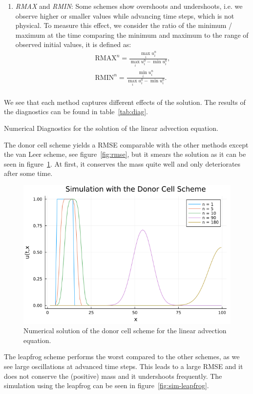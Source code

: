 \begin{enumerate}
    \item \emph{RMAX} and \emph{RMIN}: Some schemes show overshoots and undershoots,
    i.e. we observe higher
    or smaller values while advancing time steps, which is not physical. To 
    measure this effect, we consider
    the ratio of the minimum / maximum at the time comparing the minimum and maximum
    to the range of observed 
    initial values, it is defined as:
    \begin{align*}
        \mathrm{RMAX}^n = \frac{\max_i u_i^n}{\max_i u_i^0 - \min u_i^0}, \\[1em]
        \mathrm{RMIN}^n = \frac{\min_i u_i^n}{\max_i u_i^0 - \min u_i^0}. \\
    \end{align*}    
\end{enumerate}
We see that each method captures different effects of the solution. The results of the diagnostics can be found in table~\ref{tab:diag}.

\begin{table}[ht]
    \centering
    \resizebox{\textwidth}{!}{%
    
    }
    \caption{Numerical Diagnostics for the solution of the linear advection equation.}
    \label{tab:diag}
\end{table}
The donor cell scheme yields a RMSE comparable with the other methods except the van Leer scheme,
see figure~\ref{fig:rmse}, but it smears the solution as it can be seen in 
figure~\ref{fig:sim-donorcell}. At first, it conserves the mass quite well and only deteriorates
after some time.
\begin{figure}[ht]
    \centering
    \includegraphics[width=0.66\linewidth]{./images/rectangle-simulation-donorcell.png}
    \caption{Numerical solution of the donor cell scheme for the linear advection equation.}
    \label{fig:sim-donorcell}
\end{figure}

The leapfrog scheme performs the worst compared to the other schemes, as we see large oscillations
at advanced time steps. This leads to a large RMSE and it does not conserve the (positive) mass and
it undershoots frequently. The simulation using the leapfrog can be seen in 
figure~\ref{fig:sim-leapfrog}.

